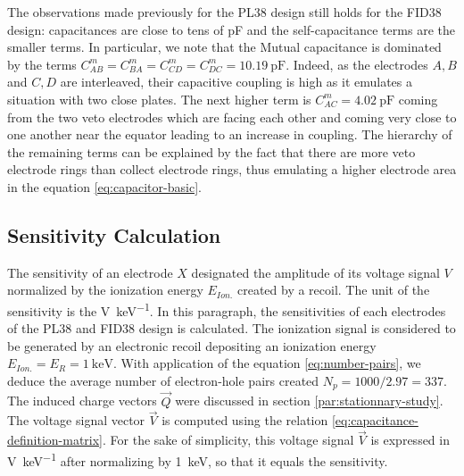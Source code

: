 The observations made previously for the PL38 design still holds for the FID38 design: capacitances are close to tens of \si{\pico\farad} and the self-capacitance terms are the smaller terms. In particular, we note that the Mutual capacitance is dominated by the terms $C_{AB}^m=C_{BA}^m=C_{CD}^m=C_{DC}^m=\SI{10.19}{\pico\farad}$. Indeed, as the electrodes $A,B$ and $C,D$ are interleaved, their capacitive coupling is high as it emulates a situation with two close plates. The next higher term is $C_{AC}^m=\SI{4.02}{\pico\farad}$ coming from the two veto electrodes which are facing each other and coming very close to one another near the equator leading to an increase in coupling. The hierarchy of the remaining terms can be explained by the fact that there are more veto electrode rings than collect electrode rings, thus emulating a higher electrode area in the equation \ref{eq:capacitor-basic}.


\subsection{Sensitivity Calculation}
\label{par:sensitivity-calculation}


The sensitivity of an electrode $X$ designated the amplitude of its voltage signal $V$ normalized by the ionization energy $E_{Ion.}$ created by a recoil. The unit of the sensitivity is the \si{\volt \per \kilo\eV}. In this paragraph, the sensitivities of each electrodes of the PL38 and FID38 design is calculated. The ionization signal is considered to be generated by an electronic recoil depositing an ionization energy $E_{Ion.} = E_R = \SI{1}{\kilo\eV}$. With application of the equation \ref{eq:number-pairs}, we deduce the average number of electron-hole pairs created $N_p = 1000/2.97 = 337$. The induced charge vectors $\vec{Q}$ were discussed in section \ref{par:stationnary-study}. The voltage signal vector $\vec{V}$ is computed using the relation \ref{eq:capacitance-definition-matrix}. For the sake of simplicity, this voltage signal $\vec{V}$ is expressed in \si{\volt\per\kilo\eV} after normalizing by \SI{1}{\kilo\eV}, so that it equals the sensitivity.

